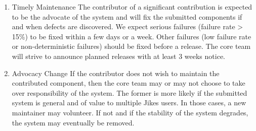 \begin{enumerate}
\item{Timely Maintenance}  
The contributor of a significant contribution is expected to be the
advocate of the system and will fix the submitted components if and
when defects are discovered.  We expect serious failures (failure rate
> 15\%) to be fixed within a few days or a week.  Other failures (low
failure rate or non-deterministic failures) should be fixed before a
release.  The core team will strive to announce planned releases with
at least 3 weeks notice.

\item{Advocacy Change}  
If the contributor does not wish to maintain the contributed
component, then the core team may or may not choose to take over
responsibility of the system.  The former is more likely if the
submitted system is general and of value to multiple Jikes users.  
In those cases, a new maintainer may volunteer.  If not and if the
stability of the system degrades, the system may eventually be
removed.

\end{enumerate}